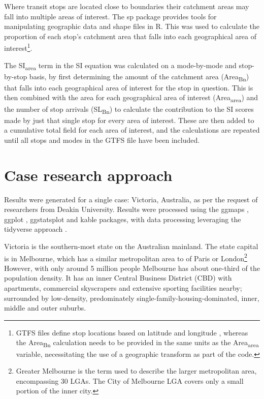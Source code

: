 \documentclass[]{tufte-book}
\begin{document}
Where transit stops are located close to boundaries their catchment
areas may fall into multiple areas of interest. The sp package
\citep{R-sf} provides tools for manipulating geographic data and shape
files in R. This was used to calculate the proportion of each stop's
catchment area that falls into each geographical area of
interest\footnote{GTFS files define stop locations based on latitude and
  longitude \citep{GTFS}, whereas the Area\textsubscript{Bn} calculation
  needs to be provided in the same units as the Area\textsubscript{area}
  variable, necessitating the use of a geographic transform as part of
  the code.}.

The SI\textsubscript{area} term in the SI equation was calculated on a
mode-by-mode and stop-by-stop basis, by first determining the amount of
the catchment area (Area\textsubscript{Bn}) that falls into each
geographical area of interest for the stop in question. This is then
combined with the area for each geographical area of interest
(Area\textsubscript{area}) and the number of stop arrivals
(SL\textsubscript{Bn}) to calculate the contribution to the SI scores
made by just that single stop for every area of interest. These are then
added to a cumulative total field for each area of interest, and the
calculations are repeated until all stops and modes in the GTFS file
have been included.

\hypertarget{case-research-approach}{%
\section{Case research approach}\label{case-research-approach}}

Results were generated for a single case: Victoria, Australia, as per
the request of researchers from Deakin University. Results were
processed using the ggmaps \citep{R-ggmap}, ggplot \citep{R-ggplot2},
ggstatsplot \citep{R-ggstatsplot} and kable
\citep{R-kableExtra, R-knitr} packages, with data processing leveraging
the tidyverse approach \citep{R-tidyverse}.

Victoria is the southern-most state on the Australian mainland. The
state capital is in Melbourne, which has a similar metropolitan area to
of Paris or London\footnote{Greater Melbourne is the term used to
  describe the larger metropolitan area, encompassing 30 LGAs. The City
  of Melbourne LGA covers only a small portion of the inner city.}
However, with only around 5 million people Melbourne has about one-third
of the population density. It has an inner Central Business District
(CBD) with apartments, commercial skyscrapers and extensive sporting
facilities nearby; surrounded by low-density, predominately
single-family-housing-dominated, inner, middle and outer suburbs.
\end{document}
